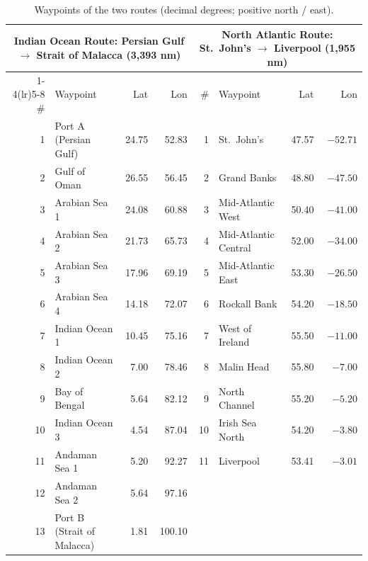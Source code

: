 \documentclass[review,authoryear]{elsarticle}
\begin{document}
\begin{table}[ht]
	\centering
	\footnotesize
	\caption{Waypoints of the two routes (decimal degrees; positive north / east).}
	\label{tab:waypoints}
	\begin{tabular}{rlrr@{\hspace{1.5em}}rlrr}
		\toprule
		\multicolumn{4}{c}{Indian Ocean Route: Persian Gulf $\rightarrow$ Strait of Malacca (3{,}393 nm)} &
		\multicolumn{4}{c}{North Atlantic Route: St.\ John's $\rightarrow$ Liverpool (1{,}955 nm)} \\
		\cmidrule(lr){1-4}\cmidrule(lr){5-8}
		\# & Waypoint & Lat & Lon & \# & Waypoint & Lat & Lon \\
		\midrule
		1  & Port A (Persian Gulf)       & 24.75 & 52.83  & 1  & St.\ John's          & 47.57 & $-52.71$ \\
		2  & Gulf of Oman                & 26.55 & 56.45  & 2  & Grand Banks          & 48.80 & $-47.50$ \\
		3  & Arabian Sea 1               & 24.08 & 60.88  & 3  & Mid-Atlantic West    & 50.40 & $-41.00$ \\
		4  & Arabian Sea 2               & 21.73 & 65.73  & 4  & Mid-Atlantic Central & 52.00 & $-34.00$ \\
		5  & Arabian Sea 3               & 17.96 & 69.19  & 5  & Mid-Atlantic East    & 53.30 & $-26.50$ \\
		6  & Arabian Sea 4               & 14.18 & 72.07  & 6  & Rockall Bank         & 54.20 & $-18.50$ \\
		7  & Indian Ocean 1              & 10.45 & 75.16  & 7  & West of Ireland      & 55.50 & $-11.00$ \\
		8  & Indian Ocean 2              &  7.00 & 78.46  & 8  & Malin Head           & 55.80 & $-7.00$  \\
		9  & Bay of Bengal               &  5.64 & 82.12  & 9  & North Channel        & 55.20 & $-5.20$  \\
		10 & Indian Ocean 3              &  4.54 & 87.04  & 10 & Irish Sea North      & 54.20 & $-3.80$  \\
		11 & Andaman Sea 1               &  5.20 & 92.27  & 11 & Liverpool            & 53.41 & $-3.01$  \\
		12 & Andaman Sea 2               &  5.64 & 97.16  &    &                      &       &          \\
		13 & Port B (Strait of Malacca)  &  1.81 & 100.10 &    &                      &       &          \\
		\bottomrule
	\end{tabular}
\end{table}
\end{document}
